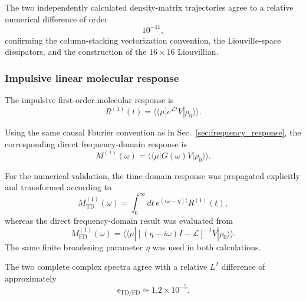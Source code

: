 \documentclass[11pt]{article}
\begin{document}
The two independently calculated density-matrix trajectories agree to
a relative numerical difference of order
%
\begin{equation}
10^{-11},
\end{equation}
%
confirming the column-stacking vectorization convention, the
Liouville-space dissipators, and the construction of the
$16\times16$ Liouvillian.


\subsubsection{Impulsive linear molecular response}

The impulsive first-order molecular response is
%
\begin{equation}
\boxed{
R^{(1)}(t)
=
\langle\!\langle\mu|
e^{\mathcal{L}t}
V
|\rho_0\rangle\rangle .
}
\label{eq:linear_response_time}
\end{equation}

Using the same causal Fourier convention as in
Sec.~\ref{sec:frequency_response}, the corresponding direct
frequency-domain response is
%
\begin{equation}
\boxed{
M^{(1)}(\omega)
=
\langle\!\langle\mu|
G(\omega)
V
|\rho_0\rangle\rangle .
}
\label{eq:linear_response_frequency}
\end{equation}

For the numerical validation, the time-domain response was propagated
explicitly and transformed according to
%
\begin{equation}
M_{\mathrm{TD}}^{(1)}(\omega)
=
\int_0^\infty
dt\,
e^{(i\omega-\eta)t}
R^{(1)}(t),
\label{eq:linear_td_transform}
\end{equation}
%
whereas the direct frequency-domain result was evaluated from
%
\begin{equation}
M_{\mathrm{FD}}^{(1)}(\omega)
=
\langle\!\langle\mu|
\left[
(\eta-i\omega)I-\mathcal{L}
\right]^{-1}
V
|\rho_0\rangle\rangle .
\label{eq:linear_fd_resolvent}
\end{equation}
%
The same finite broadening parameter $\eta$ was used in both
calculations.

The two complete complex spectra agree with a relative $L^2$
difference of approximately
%
\begin{equation}
\boxed{
\epsilon_{\mathrm{TD/FD}}
\simeq
1.2\times10^{-5}.
}
\label{eq:linear_td_fd_error}
\end{equation}
\end{document}
